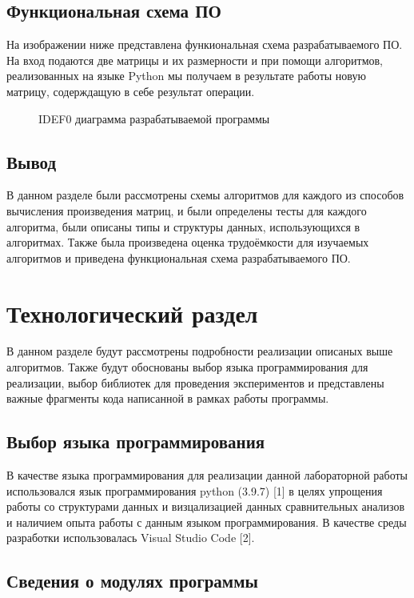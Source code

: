 \section{Функциональная схема ПО}
На изображении ниже представлена функиональная схема разрабатываемого ПО. На вход подаются две матрицы и их размерности и при помощи алгоритмов, реализованных на языке Python мы получаем в результате работы новую матрицу, содерждащую в себе результат операции.

\newpage

\begin{figure}[ph!]
	\caption{IDEF0 диаграмма разрабатываемой программы}
\end{figure}

\section{Вывод}
В данном разделе были рассмотрены схемы алгоритмов для каждого из способов вычисления произведения матриц, и были определены тесты для каждого алгоритма, были описаны типы и структуры данных, использующихся в алгоритмах. Также была произведена оценка трудоёмкости для изучаемых алгоритмов и приведена функциональная схема разрабатываемого ПО.

\chapter{Технологический раздел}

В данном разделе будут рассмотрены подробности реализации описаных выше алгоритмов. Также будут обоснованы выбор языка программирования для реализации, выбор библиотек для проведения экспериментов и представлены важные фрагменты кода написанной в рамках работы программы.

\section{Выбор языка программирования}

В качестве языка программирования для реализации данной лабораторной работы использовался язык программирования python (3.9.7) [1] в целях упрощения работы со структурами данных и визцализацией данных сравнительных анализов и наличием опыта работы с данным языком программирования. В качестве среды разработки использовалась Visual Studio Code [2]. 

\section{Сведения о модулях программы}

